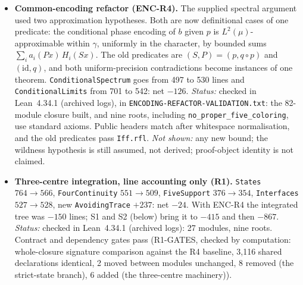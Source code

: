 \documentclass[11pt]{article}
\theoremstyle{definition}
\theoremstyle{remark}
\begin{document}
\begin{itemize}
\item \textbf{Common-encoding refactor (ENC-R4).}
The supplied spectral argument used two approximation hypotheses. Both are
now definitional cases of one predicate: the conditional phase encoding of $b$
given $p$ is $L^2(\mu)$-approximable within $\gamma$, uniformly in the
character, by bounded sums $\sum_i a_i(Px)\,H_i(Sx)$. The old predicates are
$(S,P)=(p,q\circ p)$ and $(\mathrm{id},q)$, and both uniform-precision
contradictions become instances of one theorem. \texttt{Conditional\allowbreak{}Spectrum}
goes from 497 to 530 lines and \texttt{Conditional\allowbreak{}Limits} from 701 to 542: net
$-126$.
\emph{Status:} checked in Lean~4.34.1 (archived logs), in
\texttt{ENCODING-\allowbreak{}REFACTOR-\allowbreak{}VALIDATION.\allowbreak{}txt}: the 82-module closure built, and
nine roots, including \texttt{no\_\allowbreak{}proper\_\allowbreak{}five\_\allowbreak{}coloring}, use standard axioms.
Public headers match after whitespace normalisation, and the old predicates
pass \texttt{Iff.rfl}.
\emph{Not shown:} any new bound; the wildness hypothesis is still assumed,
not derived; proof-object identity is not claimed.

\item \textbf{Three-centre integration, line accounting only (R1).}
\texttt{States} $764\to566$, \texttt{FourContinuity} $551\to509$,
\texttt{FiveSupport} $376\to354$, \texttt{Interfaces} $527\to528$, new
\texttt{AvoidingTrace} $+237$: net $-24$. With ENC-R4 the integrated tree was
$-150$ lines; S1 and S2 (below) bring it to $-415$ and then $-867$.
\emph{Status:} checked in Lean~4.34.1 (archived logs): 27 modules, nine
roots. Contract and dependency gates pass (R1-GATES, checked by computation:
whole-closure signature comparison against the R4 baseline, 3,116 shared
declarations identical, 2 moved between modules unchanged, 8 removed (the
strict-state branch), 6 added (the three-centre machinery)).


\end{itemize}
\end{document}
